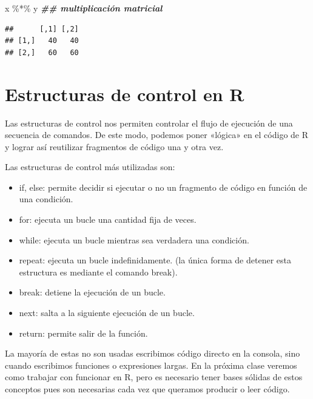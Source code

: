 \documentclass[
  12pt,
]{book}
\newenvironment{Shaded}{\begin{snugshade}}{\end{snugshade}}
\newcommand{\DocumentationTok}[1]{\textcolor[rgb]{0.56,0.35,0.01}{\textbf{\textit{#1}}}}
\newcommand{\NormalTok}[1]{#1}
\newcommand{\SpecialCharTok}[1]{\textcolor[rgb]{0.00,0.00,0.00}{#1}}
\providecommand{\tightlist}{%
  \setlength{\itemsep}{0pt}\setlength{\parskip}{0pt}}
\begin{document}
\begin{Shaded}
\begin{Highlighting}[]
\NormalTok{x }\SpecialCharTok{\%*\%}\NormalTok{ y }\DocumentationTok{\#\# multiplicación matricial}
\end{Highlighting}
\end{Shaded}

\begin{verbatim}
##      [,1] [,2]
## [1,]   40   40
## [2,]   60   60
\end{verbatim}

\hypertarget{estructuras-de-control-en-r}{%
\chapter{\texorpdfstring{\textbf{Estructuras de control en R}}{Estructuras de control en R}}\label{estructuras-de-control-en-r}}

Las estructuras de control nos permiten controlar el flujo de ejecución de una secuencia de comandos.
De este modo, podemos poner «lógica» en el código de R y lograr así reutilizar fragmentos de código una y otra vez.

Las estructuras de control más utilizadas son:

\begin{itemize}
\tightlist
\item
  if, else: permite decidir si ejecutar o no un fragmento de código en función de una condición.
\item
  for: ejecuta un bucle una cantidad fija de veces.
\item
  while: ejecuta un bucle mientras sea verdadera una condición.
\item
  repeat: ejecuta un bucle indefinidamente. (la única forma de detener esta estructura es mediante el comando break).
\item
  break: detiene la ejecución de un bucle.
\item
  next: salta a la siguiente ejecución de un bucle.
\item
  return: permite salir de la función.
\end{itemize}

La mayoría de estas no son usadas escribimos código directo en la consola, sino cuando escribimos funciones o expresiones largas. En la próxima clase veremos como trabajar con funcionar en R, pero es necesario tener bases sólidas de estos conceptos pues son necesarias cada vez que queramos producir o leer código.
\end{document}
